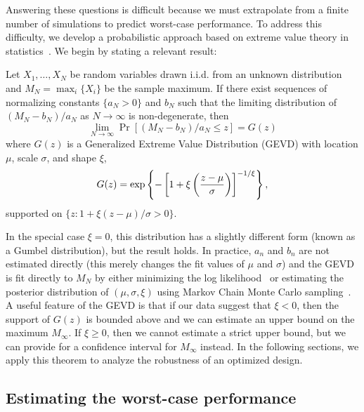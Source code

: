 Answering these questions is difficult because we must extrapolate from a finite number of simulations to predict worst-case performance. To address this difficulty, we develop a probabilistic approach based on extreme value theory in statistics~\cite{sridhar2021improving,wood_zhang_1996,coles_2001}. We begin by stating a relevant result:

\begin{theorem}\label{ch:rss:extreme_value_thm}
    Let $X_1, \ldots, X_N$ be random variables drawn i.i.d. from an unknown distribution and $M_N = \max_i \{ X_i \}$ be the sample maximum. If there exist sequences of normalizing constants $\{a_N > 0\}$ and $b_N$ such that the limiting distribution of $(M_N - b_N)/a_N$ as $N\to\infty$ is non-degenerate, then
    \begin{equation}
        \lim_{N\to\infty} \Pr\left[(M_N - b_N) / a_N \leq z \right] = G(z)
    \end{equation}
    where $G(z)$ is a Generalized Extreme Value Distribution (GEVD) with location $\mu$, scale $\sigma$, and shape $\xi$,
    \begin{equation}
        G(z) = \exp \left\{ -\left[ 1 + \xi\left( \frac{z - \mu}{\sigma} \right) \right]^{-1/\xi} \right\},
    \end{equation}
    supported on $\{z : 1 + \xi(z - \mu)/\sigma > 0\}$.
\end{theorem}

In the special case $\xi = 0$, this distribution has a slightly different form (known as a Gumbel distribution), but the result holds. In practice, $a_n$ and $b_n$ are not estimated directly (this merely changes the fit values of $\mu$ and $\sigma$) and the GEVD is fit directly to $M_N$ by either minimizing the log likelihood~\cite{coles_2001} or estimating the posterior distribution of $(\mu, \sigma, \xi)$ using Markov Chain Monte Carlo sampling~\cite{salvatier_wiecki_fonnesbeck_2016}. A useful feature of the GEVD is that if our data suggest that $\xi < 0$, then the support of $G(z)$ is bounded above and we can estimate an upper bound on the maximum $M_\infty$. If $\xi \geq 0$, then we cannot estimate a strict upper bound, but we can provide for a confidence interval for $M_\infty$ instead. In the following sections, we apply this theorem to analyze the robustness of an optimized design.

\subsection{Estimating the worst-case performance}

